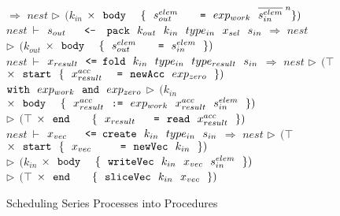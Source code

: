 \begin{figure*}[ht]
\begin{tabbing}
\> $\Rightarrow$ 
        \> $nest$
        \> $\rhd~~ (k_{in}$
        \> $\times~~ \tt{body}~~~~ 
                \{~~ s^{elem}_{out} ~~~~~~\tt{=}~~ exp_{work}~~ \ov{s^{elem}_{in}}^{\;n} \} )$ 
\\[1em]


 \> $nest~ \vdash$
        \> $s_{out} ~~~~~\tt{<-}
               ~~~ \tt{pack} 
                       ~~ k_{out}
                       ~~ k_{in}
                       ~~ type_{in}
                       ~~ x_{sel}
                       ~~ s_{in}$
\> $\Rightarrow$
        \> $nest$
        \> $\rhd~~ (k_{out}$
        \> $\times~~ \tt{body}~~~~ 
                \{~~ s^{elem}_{out} ~~~~~~\tt{=}~~ s^{elem}_{in} ~~\})$
\\[1em]


 \> $nest~ \vdash$
        \> $x_{result}~~  
                        \tt{<= fold}~~ k_{in}~~ type_{in}~~ type_{result}~~ s_{in}$ 
 \> $\Rightarrow$
        \> $nest$
        \> $\rhd~~ (\top$
        \> $\times~~ \tt{start}~~   
                \{~~ x^{acc}_{result} ~~~~\tt{=}~~ \tt{newAcc}~~ exp_{zero} ~~\})$
 \\[0.5ex]     


 \>     \> \hspace{5em} $\tt{with}   ~~ exp_{work}
                      ~~ \tt{and}    ~~ exp_{zero}$
 \>     \> 
        \> $\rhd~~ (k_{in}$
        \> $\times~~ \tt{body}~~~~    
                \{~~ x^{acc}_{result}~~ \tt{:=}~~ exp_{work}~~ x^{acc}_{result}~~ s^{elem}_{in} ~~\})$
 \\[0.5ex]


 \>     \>
 \>     \> 
        \> $\rhd~~ (\top$
        \> $\times~~ \tt{end}~~~~~~ 
                \{~~ x_{result}~~~~~ \tt{=}~~ \tt{read}~~ x^{acc}_{result} ~~\})$
 \\[1em]


 \> $nest~ \vdash$    
        \> $x_{vec}~~~~~
                        \tt{<= create}~~ k_{in}~~ type_{in}~~ s_{in}$
 \> $\Rightarrow$
        \> $nest$
        \> $\rhd~~ (\top$
        \> $\times~~ \tt{start}~~
                \{~~ x_{vec}~~~~~~~~ \tt{=}~~ \tt{newVec}~~ k_{in} ~~\})$
 \\[0.5ex]

 \>     \>
 \>     \> 
        \> $\rhd~~ (k_{in}$
        \> $\times~~ \tt{body}~~~~
                \{~~ \tt{writeVec}~~ k_{in}~~ x_{vec}~~ s^{elem}_{in}~~ \})$
 \\[0.5ex]

 \>     \>
 \>     \>
        \> $\rhd~~ (\top$
        \> $\times~~ \tt{end}~~~~~~
                \{~~ \tt{sliceVec}~~ k_{in}~~ x_{vec}~~ \})$
\end{tabbing}
\caption{Scheduling Series Processes into Procedures}
\label{f:Scheduling}
\end{figure*}
